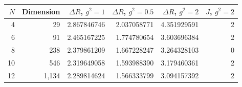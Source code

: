 \begin{tabular}{@{}rrrrrr@{}}\toprule
$N$ & Dimension & $\Delta R$, $g^2=1$ & $\Delta R$, $g^2=0.5$ & $\Delta R$, $g^2=2$ & $J$, $g^2=2$\\\midrule
4 & 29 & 2.867846746 & 2.037058771 & 4.351929591 & 2 \\
6 & 91 & 2.465167225 & 1.774780654 & 3.603696384 & 2 \\
8 & 238 & 2.379861209 & 1.667228247 & 3.264328103 & 0 \\
10 & 546 & 2.319649058 & 1.593988390 & 3.179460361 & 2 \\
12 & 1,134 & 2.289814624 & 1.566333799 & 3.094157392 & 2 \\
\bottomrule\end{tabular}
